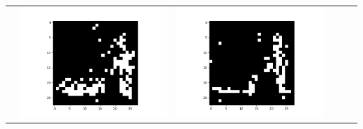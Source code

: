 \documentclass[12pt]{report}
\begin{document}
\begin{table}[H]
\begin{tabular}{  c  c  c  c  c  c }
\begin{minipage}{.15\textwidth}
    \end{minipage} &
    \begin{minipage}{.15\textwidth}
      \includegraphics[scale=0.2]{BM_f2.png}
    \end{minipage} &
    \begin{minipage}{.15\textwidth}
      \includegraphics[scale=0.2]{BM_f4.png}
    \end{minipage} &
    \begin{minipage}{.15\textwidth}

\end{minipage}
\end{tabular}
\end{table}
\end{document}
